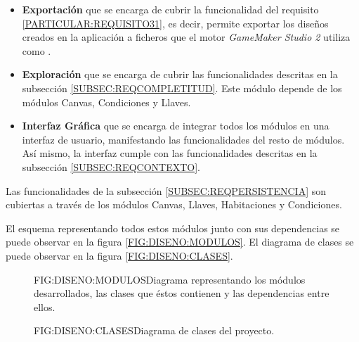 \begin{itemize}
	\item \textbf{Exportación} que se encarga de cubrir la funcionalidad del requisito \ref{PARTICULAR:REQUISITO31}, es decir, permite exportar los diseños creados en la aplicación a ficheros que el motor \textit{GameMaker Studio 2} utiliza como .
	\item \textbf{Exploración} que se encarga de cubrir las funcionalidades descritas en la subsección \ref{SUBSEC:REQCOMPLETITUD}. Este módulo depende de los módulos Canvas, Condiciones y Llaves.
	\item \textbf{Interfaz Gráfica} que se encarga de integrar todos los módulos en una interfaz de usuario, manifestando las funcionalidades del resto de módulos. Así mismo, la interfaz cumple con las funcionalidades descritas en la subsección \ref{SUBSEC:REQCONTEXTO}.
\end{itemize}

Las funcionalidades de la subsección \ref{SUBSEC:REQPERSISTENCIA} son cubiertas a través de los módulos Canvas, Llaves, Habitaciones y Condiciones.

El esquema representando todos estos módulos junto con sus dependencias se puede observar en la figura \ref{FIG:DISENO:MODULOS}.
El diagrama de clases se puede observar en la figura \ref{FIG:DISENO:CLASES}.

\begin{figure}{FIG:DISENO:MODULOS}{Diagrama representando los módulos desarrollados, las clases que éstos contienen y las dependencias entre ellos.}
\end{figure}

\begin{figure}{FIG:DISENO:CLASES}{Diagrama de clases del proyecto.}
\end{figure}